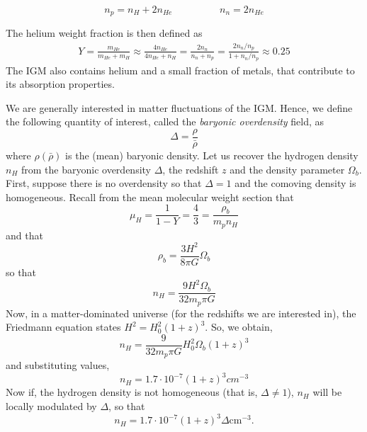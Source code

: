 \begin{equation}
    n_p=n_H+2n_{He} \hspace{2cm} n_n=2n_{He}
\end{equation}

The helium weight fraction is then defined as
\begin{eqnarray}
    Y=\frac{m_{He}}{m_{He}+m_H}\approx \frac{4n_{He}}{4n_{He}+n_H}=\frac{2n_n}{n_n+n_p}=\frac{2 n_n/n_p}{1+n_n/n_p}\approx 0.25 
\end{eqnarray}
The IGM also contains helium and a small fraction of metals, that contribute to its absorption properties.

We are generally interested in matter fluctuations of the IGM. Hence, we define the following quantity of interest, called the \emph{baryonic overdensity} field, as 
\begin{equation}
    \Delta =\frac{\rho}{\bar{\rho}}
\end{equation}
where $\rho(\bar{\rho})$ is the (mean) baryonic density. Let us recover the hydrogen density $n_H$ from the baryonic overdensity $\Delta$, the redshift $z$ and the density parameter $\Omega_b$.
First, suppose there is no overdensity so that $\Delta=1$ and the comoving density is homogeneous. Recall from the mean molecular weight section that
\begin{equation}
    \mu_H=\frac{1}{1-Y}=\frac{4}{3}=\frac{\rho_b}{m_pn_H}
\end{equation}
and that
\begin{equation}
    \rho_b=\frac{3H^2}{8\pi G}\Omega_b
\end{equation}
so that
\begin{equation}
    n_H=\frac{9H^2 \Omega_b}{32m_p\pi G} 
\end{equation}
Now, in a matter-dominated universe (for the redshifts we are interested in), the Friedmann equation states $H^2=H_0^2(1+z)^3$.
So, we obtain,
\begin{equation}
    n_H=\frac{9}{32m_p\pi G}H_0^2\Omega_b (1+z)^3
\end{equation}
and substituting values,
\begin{equation}
    n_H=1.7\cdot 10^{-7}(1+z)^3 cm^{-3}
\end{equation}
Now if, the hydrogen density is not homogeneous (that is, $\Delta \neq 1$), $n_H$ will be locally modulated by $\Delta$, so that
\begin{equation}\label{eq: delta and hydrogen density}
    n_H=1.7\cdot 10^{-7}(1+z)^3 \Delta \mathrm{cm}^{-3} .
\end{equation}
